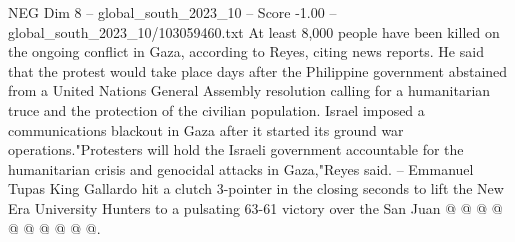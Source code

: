 \begin{textsample}{NEG Dim 8 – global\_south\_2023\_10 – Score -1.00 – global\_south\_2023\_10/103059460.txt}
At least 8,000 people have been killed on the ongoing conflict in Gaza, according to Reyes, citing news reports.
He said that the protest would take place days after the Philippine government abstained from a United Nations General Assembly resolution calling for a humanitarian truce and the protection of the civilian population.
Israel imposed a communications blackout in Gaza after it started its ground war operations."Protesters will hold the Israeli government accountable for the humanitarian crisis and genocidal attacks in Gaza,"Reyes said. -- Emmanuel Tupas King Gallardo hit a clutch 3-pointer in the closing seconds to lift the New Era University Hunters to a pulsating 63-61 victory over the San Juan @ @ @ @ @ @ @ @ @ @.

\end{textsample}
